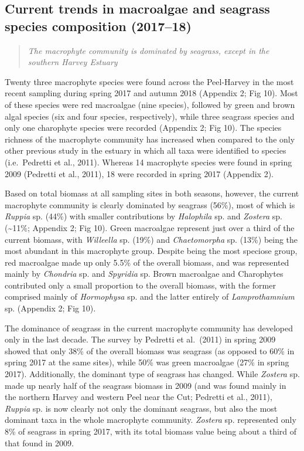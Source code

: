 \documentclass[
]{book}
\begin{document}
\hypertarget{current-trends-in-macroalgae-and-seagrass-species-composition-201718}{%
\subsection{Current trends in macroalgae and seagrass species composition (2017--18)}\label{current-trends-in-macroalgae-and-seagrass-species-composition-201718}}

\begin{quote}
\emph{The macrophyte community is dominated by seagrass, except in the southern Harvey Estuary}
\end{quote}

Twenty three macrophyte species were found across the Peel-Harvey in the most recent sampling during spring 2017 and autumn 2018 (Appendix 2; Fig 10). Most of these species were red macroalgae (nine species), followed by green and brown algal species (six and four species, respectively), while three seagrass species and only one charophyte species were recorded (Appendix 2; Fig 10). The species richness of the macrophyte community has increased when compared to the only other previous study in the estuary in which all taxa were identified to species (i.e.~Pedretti et al., 2011). Whereas 14 macrophyte species were found in spring 2009 (Pedretti et al., 2011), 18 were recorded in spring 2017 (Appendix 2).

Based on total biomass at all sampling sites in both seasons, however, the current macrophyte community is clearly dominated by seagrass (56\%), most of which is \emph{Ruppia} sp. (44\%) with smaller contributions by \emph{Halophila} sp. and \emph{Zostera} sp. (\textasciitilde11\%; Appendix 2; Fig 10). Green macroalgae represent just over a third of the current biomass, with \emph{Willeella} sp. (19\%) and \emph{Chaetomorpha} sp. (13\%) being the most abundant in this macrophyte group. Despite being the most speciose group, red macroalgae made up only 5.5\% of the overall biomass, and was represented mainly by \emph{Chondria} sp. and \emph{Spyridia} sp. Brown macroalgae and Charophytes contributed only a small proportion to the overall biomass, with the former comprised mainly of \emph{Hormophysa} sp. and the latter entirely of \emph{Lamprothamnium} sp. (Appendix 2; Fig 10).

The dominance of seagrass in the current macrophyte community has developed only in the last decade. The survey by Pedretti et al.~(2011) in spring 2009 showed that only 38\% of the overall biomass was seagrass (as opposed to 60\% in spring 2017 at the same sites), while 50\% was green macroalgae (27\% in spring 2017). Additionally, the dominant type of seagrass has changed. While \emph{Zostera} sp. made up nearly half of the seagrass biomass in 2009 (and was found mainly in the northern Harvey and western Peel near the Cut; Pedretti et al., 2011), \emph{Ruppia} sp. is now clearly not only the dominant seagrass, but also the most dominant taxa in the whole macrophyte community. \emph{Zostera} sp. represented only 8\% of seagrass in spring 2017, with its total biomass value being about a third of that found in 2009.
\end{document}
